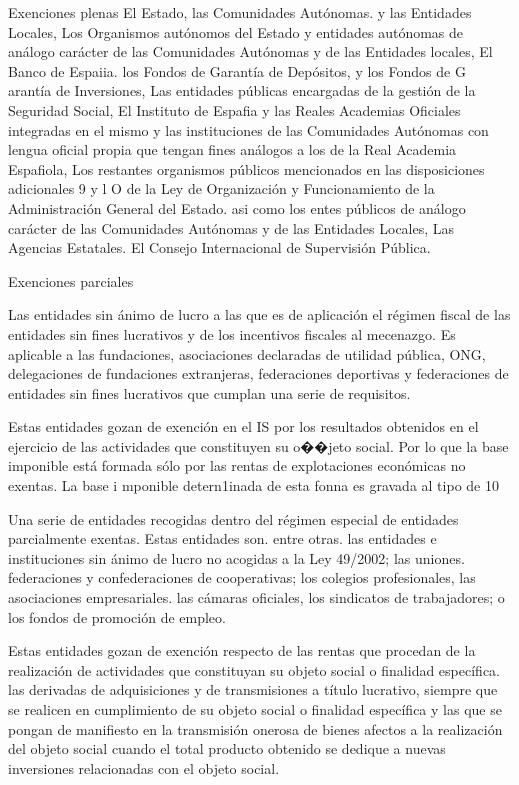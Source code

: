\documentclass[10pt,a4paper]{article}
\begin{document}
Exenciones plenas
El Estado, las Comunidades Autónomas. y las Entidades Locales,
Los Organismos autónomos del Estado y entidades autónomas de análogo carácter de las Comunidades Autónomas y de las Entidades locales,
El Banco de Espaiia. los Fondos de Garantía de Depósitos, y los Fondos de G arantía de Inversiones,
Las entidades públicas encargadas de la gestión de la Seguridad Social,
El Instituto de Espafia y las Reales Academias Oficiales integradas en el mismo y las instituciones de las Comunidades Autónomas con lengua oficial propia que tengan fines análogos a los de la Real Academia Espafiola,
Los restantes organismos públicos mencionados en las disposiciones adicionales 9 y l O de la Ley de Organización y Funcionamiento de la Administración General del Estado. asi como los entes públicos de análogo carácter de las Comunidades Autónomas y de las
Entidades Locales,
Las Agencias Estatales.
El Consejo Internacional de Supervisión Pública. 

Exenciones parciales

Las entidades sin ánimo de lucro a las que es de aplicación el régimen fiscal de las entidades sin fines lucrativos y de los incentivos fiscales al mecenazgo. Es aplicable a las fundaciones, asociaciones declaradas de utilidad pública, ONG, delegaciones de fundaciones extranjeras, federaciones deportivas y federaciones de entidades sin fines lucrativos que cumplan una serie de requisitos.

Estas entidades gozan de exención en el IS por los resultados obtenidos en el ejercicio de las actividades que constituyen su o��jeto social. Por lo que la base imponible está formada sólo por las rentas de explotaciones económicas no exentas. La base i mponible detern1inada de esta fonna es gravada al tipo de 10%

Una serie de entidades recogidas dentro del régimen especial de entidades parcialmente exentas. Estas entidades son. entre otras. las entidades e instituciones sin ánimo de lucro no acogidas a la Ley 49/2002; las uniones. federaciones y confederaciones de cooperativas; los colegios profesionales, las asociaciones empresariales. las cámaras oficiales, los sindicatos de trabajadores; o los fondos de promoción de empleo.

Estas entidades gozan de exención respecto de las rentas que procedan de la realización de actividades que constituyan su objeto social o finalidad específica. las derivadas de adquisiciones y de transmisiones a título lucrativo, siempre que se realicen en cumplimiento de su objeto social o finalidad específica y las que se pongan de manifiesto en la transmisión onerosa de bienes afectos a la realización del objeto social cuando el total producto obtenido se dedique a nuevas inversiones relacionadas con el objeto social.
\end{document}
